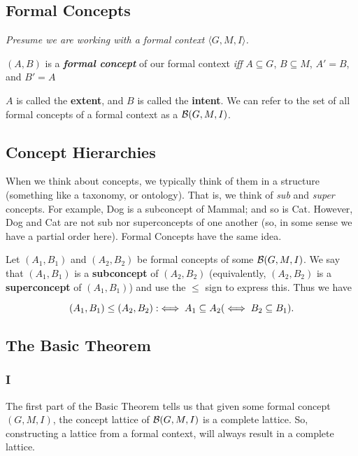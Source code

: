 \subsection{Formal Concepts}
\label{subsec:Introduction-Formal_Concepts}

\textit{Presume we are working with a formal context $\langle G, M, I \rangle$.}
\begin{definition}
    
    $(A,B)$ is a \textit{\textbf{formal concept}} of our formal context \textit{iff}    $A \subseteq G$, $B \subseteq M$, $A' = B$, and $B' = A$ 
\end{definition}

$A$ is called the \textbf{extent}, and $B$ is called the \textbf{intent}. We can refer to the set of all formal concepts of a formal context as a $\mathcal{B} (G, M, I)$.

\subsection{Concept Hierarchies}
\label{subsec:Introduction-Concept_Hierarchies}

When we think about concepts, we typically think of them in a structure (something like a taxonomy, or ontology). That is, we think of \textit{sub} and \textit{super} concepts. For example, Dog is a subconcept of Mammal; and so is Cat. However, Dog and Cat are not sub nor superconcepts of one another (so, in some sense we have a partial order here). Formal Concepts have the same idea. 

\begin{definition}
    Let $(A_1, B_1)$ and $(A_2, B_2)$ be formal concepts of some $\mathcal{B}(G,M,I)$. We say that $(A_1,B_1)$ is a \textbf{subconcept} of $(A_2,B_2)$ (equivalently, $(A_2,B_2)$ is a \textbf{superconcept} of $(A_1, B_1)$) and use the $\leq$ sign to express this. Thus we have 
    
    \[(A_1, B_1)\leq (A_2, B_2) :\iff A_1 \subseteq A_2 \space (\iff B_2 \subseteq B_1).\]
\end{definition}

\subsection{The Basic Theorem}
\label{subsec:Introduction-The_Basic_Theorem}
\subsubsection{I} 
\label{subsec:Introduction-The_basic_Theorem-I}
The first part of the Basic Theorem tells us that given some formal concept $(G,M,I)$, the concept lattice of $\mathcal{B}(G,M,I)$ is a complete lattice. So, constructing a lattice from a formal context, will always result in a complete lattice. 

